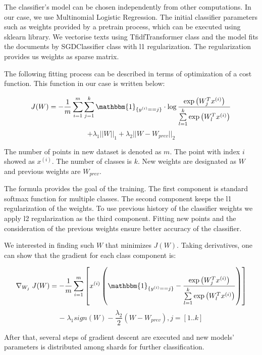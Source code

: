 The classifier's model can be chosen independently from other computations. In our case, we use Multinomial Logistic Regression. The initial classifier parameters such as weights provided by a pretrain process, which can be executed using sklearn library. We vectorise texts using TfidfTransformer class and the model fits the documents by SGDClassifier class with l1 regularization. The regularization provides us weights as sparse matrix.

The following fitting process can be described in terms of optimization of a cost function. This function in our case is written below:

\begin{center}

$$ J(W) = -\frac{1}{m} \sum \limits_{i = 1}^{m} \sum \limits_{j = 1}^{k} \mathbbm{1}_{\{y^{(i)} == j\}} \cdot \log \frac{\exp\left({W_{j}^Tx^{(i)}}\right) }{\sum \limits_{l = 1}^{k}  \exp\left({W_{l}^Tx^{(i)}}\right) }$$ 
 $$ +  \lambda_1 ||W||_1 + \lambda_2 ||W - W_{prev}||_2 $$

\end{center} 

The number of points in new dataset is denoted as $m$. The point with index $i$ showed as $x^{(i)}$. The number of classes is $k$. New weights are designated as $W$ and previous weights are $W_{prev}$.

The formula provides the goal of the training. The first component is standard softmax function for multiple classes. The second component keeps the l1 regularization of the weights. To use previous history of the classifier weights we apply l2 regularization as the third component. Fitting new points and the consideration of the previous weights ensure better accuracy of the classifier.

We interested in finding such $W$ that minimizes $J(W)$. Taking derivatives, one can show that the gradient for each class component is:

\begin{center}

$$ \nabla_{W_j} \; J(W) = -\frac{1}{m} \sum \limits_{i = 1}^{m} \left[ x^{(i)} \left( \mathbbm{1}_{\{y^{(i)} == j\} } - \frac{\exp\left({W_{j}^Tx^{(i)}}\right)}{\sum \limits_{l = 1}^{k}  \exp\left({W_{l}^Tx^{(i)}}\right)} \right) \right] $$
$$ - \; \lambda_1 sign(W) - \frac{\lambda_2}{2} \left(W - W_{prev} \right), j = [1..k] $$

\end{center} 

After that, several steps of gradient descent are executed and new models' parameters is distributed among shards for further classification.